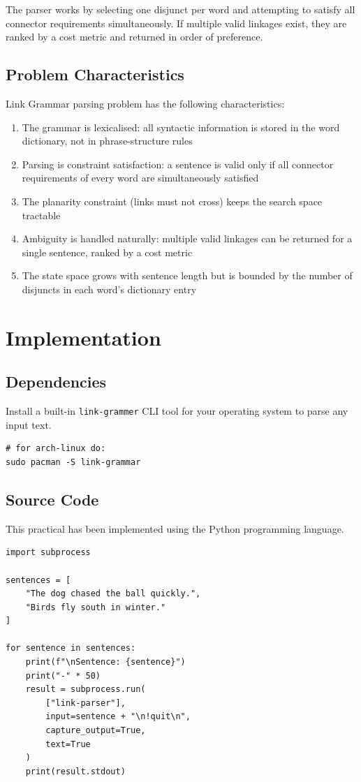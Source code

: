 \documentclass[12pt,a4paper]{report}
\begin{document}
The parser works by selecting one disjunct per word and attempting to satisfy all connector requirements simultaneously. If multiple valid linkages exist, they are ranked by a cost metric and returned in order of preference.
\subsection{Problem Characteristics}
Link Grammar parsing problem has the following characteristics:
\begin{enumerate}
    \item The grammar is lexicalised: all syntactic information is stored in the word dictionary, not in phrase-structure rules
    \item Parsing is constraint satisfaction: a sentence is valid only if all connector requirements of every word are simultaneously satisfied
    \item The planarity constraint (links must not cross) keeps the search space tractable
    \item Ambiguity is handled naturally: multiple valid linkages can be returned for a single sentence, ranked by a cost metric
    \item The state space grows with sentence length but is bounded by the number of disjuncts in each word's dictionary entry
\end{enumerate}

\section{Implementation}
\subsection{Dependencies}
Install a built-in \texttt{link-grammer} CLI tool for your operating system to parse any input text.
\begin{lstlisting}
# for arch-linux do:
sudo pacman -S link-grammar
\end{lstlisting}

\subsection{Source Code}
This practical has been implemented using the Python programming language.
\begin{lstlisting}
import subprocess

sentences = [
    "The dog chased the ball quickly.",
    "Birds fly south in winter."
]

for sentence in sentences:
    print(f"\nSentence: {sentence}")
    print("-" * 50)
    result = subprocess.run(
        ["link-parser"],
        input=sentence + "\n!quit\n",
        capture_output=True,
        text=True
    )
    print(result.stdout)
\end{lstlisting}
\end{document}
